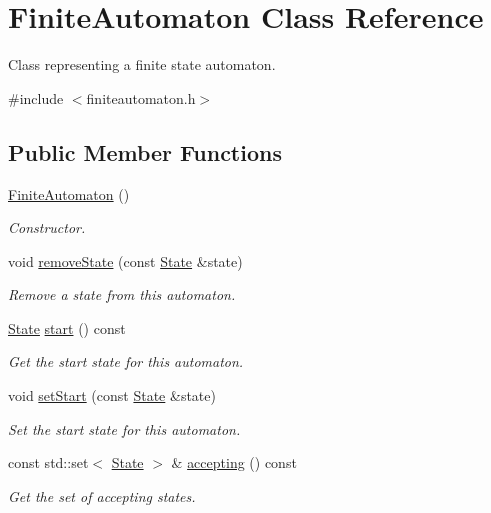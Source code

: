 \hypertarget{class_finite_automaton}{\section{\-Finite\-Automaton \-Class \-Reference}
\label{class_finite_automaton}
}


\-Class representing a finite state automaton.  




{\ttfamily \#include $<$finiteautomaton.\-h$>$}

\subsection*{\-Public \-Member \-Functions}
\begin{DoxyCompactItemize}
\item 
\hyperlink{class_finite_automaton_a23cea3adb981335a3c1da842f27ecdac}{\-Finite\-Automaton} ()
\begin{DoxyCompactList}\small\item\em \-Constructor. \end{DoxyCompactList}\item 
void \hyperlink{class_finite_automaton_a650edca52e427bf41f0bcce8c41190b9}{remove\-State} (const \hyperlink{class_state}{\-State} \&state)
\begin{DoxyCompactList}\small\item\em \-Remove a state from this automaton. \end{DoxyCompactList}\item 
\hyperlink{class_state}{\-State} \hyperlink{class_finite_automaton_ad2202baebb0606c8ce719cf915fe0abe}{start} () const 
\begin{DoxyCompactList}\small\item\em \-Get the start state for this automaton. \end{DoxyCompactList}\item 
void \hyperlink{class_finite_automaton_a6fa420ce42852c1c16b4ff1d7e1d4181}{set\-Start} (const \hyperlink{class_state}{\-State} \&state)
\begin{DoxyCompactList}\small\item\em \-Set the start state for this automaton. \end{DoxyCompactList}\item 
const std\-::set$<$ \hyperlink{class_state}{\-State} $>$ \& \hyperlink{class_finite_automaton_a9b459162b1b4276fa2bd4d0e9f55f926}{accepting} () const 
\begin{DoxyCompactList}\small\item\em \-Get the set of accepting states. \end{DoxyCompactList}\item 

\end{DoxyCompactItemize}
